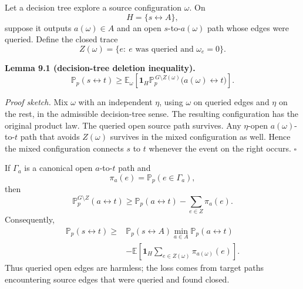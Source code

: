 \documentclass[11pt]{article}
\newcommand{\one}{\mathbf 1}
\begin{document}
Let a decision tree explore a source configuration \(\omega\). On
\[
H=\{s\leftrightarrow A\},
\]
suppose it outputs \(a(\omega)\in A\) and an open \(s\)-to-\(a(\omega)\) path whose edges were queried. Define the closed trace
\[
Z(\omega)=\{e:\ e\text{ was queried and }\omega_e=0\}.
\]

\textbf{Lemma 9.1 (decision-tree deletion inequality).}
\[
\boxed{
\mathbb P_p(s\leftrightarrow t)
\ge
\mathbb E_\omega\left[
\one_H
\mathbb P_p^{\,G\setminus Z(\omega)}
\bigl(a(\omega)\leftrightarrow t\bigr)
\right].
}
\tag{9.1}\label{eq:decisiondelete}
\]

\emph{Proof sketch.}
Mix \(\omega\) with an independent \(\eta\), using \(\omega\) on queried edges and \(\eta\) on the rest, in the admissible decision-tree sense. The resulting configuration has the original product law. The queried open source path survives. Any \(\eta\)-open \(a(\omega)\)-to-\(t\) path that avoids \(Z(\omega)\) survives in the mixed configuration as well. Hence the mixed configuration connects \(s\) to \(t\) whenever the event on the right occurs. \hfill\(\square\)

If \(\Gamma_a\) is a canonical open \(a\)-to-\(t\) path and
\[
\pi_a(e)=\mathbb P_p(e\in\Gamma_a),
\]
then
\[
\mathbb P_p^{G\setminus Z}(a\leftrightarrow t)
\ge
\mathbb P_p(a\leftrightarrow t)-\sum_{e\in Z}\pi_a(e).
\]
Consequently,
\[
\boxed{
\begin{aligned}
\mathbb P_p(s\leftrightarrow t)\ge{}&
\mathbb P_p(s\leftrightarrow A)
\min_{a\in A}\mathbb P_p(a\leftrightarrow t)\\
&-
\mathbb E\left[
\one_H\sum_{e\in Z(\omega)}\pi_{a(\omega)}(e)
\right].
\end{aligned}
}
\tag{9.2}\label{eq:pathprofile}
\]
Thus queried open edges are harmless; the loss comes from target paths encountering source edges that were queried and found closed.
\end{document}

